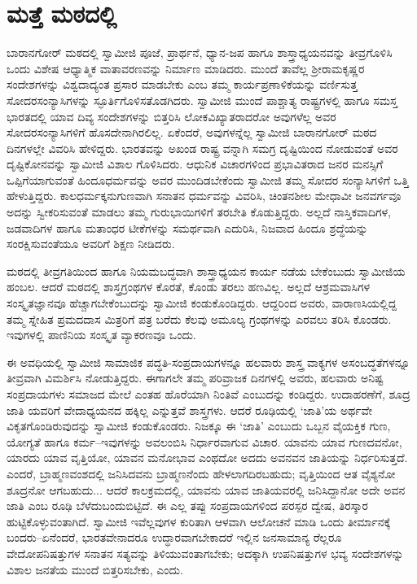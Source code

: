 
\chapter{ಮತ್ತೆ ಮಠದಲ್ಲಿ}

\noindent

ಬಾರಾನಗೋರ್ ಮಠದಲ್ಲಿ ಸ್ವಾಮೀಜಿ ಪೂಜೆ, ಪ್ರಾರ್ಥನೆ, ಧ್ಯಾನ-ಜಪ ಹಾಗೂ ಶಾಸ್ತ್ರಾಧ್ಯಯನವನ್ನು ತೀವ್ರಗೊಳಿಸಿ ಒಂದು ವಿಶೇಷ ಆಧ್ಯಾತ್ಮಿಕ ವಾತಾವರಣವನ್ನು ನಿರ್ಮಾಣ ಮಾಡಿದರು. ಮುಂದೆ ತಾವೆಲ್ಲ ಶ್ರೀರಾಮಕೃಷ್ಣರ ಸಂದೇಶಗಳನ್ನು ವಿಶ್ವದಾದ್ಯಂತ ಪ್ರಸಾರ ಮಾಡಬೇಕು ಎಂಬ ತಮ್ಮ ಕಾರ್ಯಪ್ರಣಾಳಿಕೆಯನ್ನು ವರ್ಣಿಸುತ್ತ ಸೋದರಸಂನ್ಯಾಸಿಗಳನ್ನು ಸ್ಫೂರ್ತಿಗೊಳಿಸತೊಡಗಿದರು. ಸ್ವಾಮೀಜಿ ಮುಂದೆ ಪಾಶ್ಚಾತ್ಯ ರಾಷ್ಟ್ರಗಳಲ್ಲಿ ಹಾಗೂ ಸಮಸ್ತ ಭಾರತದಲ್ಲಿ ಯಾವ ದಿವ್ಯ ಸಂದೇಶಗಳನ್ನು ಬಿತ್ತರಿಸಿ ಲೋಕವಿಖ್ಯಾತರಾದರೋ ಅವುಗಳೆಲ್ಲ ಅವರ ಸೋದರಸಂನ್ಯಾಸಿಗಳಿಗೆ ಹೊಸದೇನಾಗಿರಲಿಲ್ಲ. ಏಕೆಂದರೆ, ಅವುಗಳನ್ನೆಲ್ಲ ಸ್ವಾಮೀಜಿ ಬಾರಾನಗೋರ್ ಮಠದ ದಿನಗಳಲ್ಲೇ ವಿವರಿಸಿ ಹೇಳಿದ್ದರು. ಭಾರತವನ್ನು ಅಖಂಡ ರಾಷ್ಟ್ರ ವನ್ನಾಗಿ ಸಮಗ್ರ ದೃಷ್ಟಿಯಿಂದ ನೋಡುವಂತೆ ಅವರ ದೃಷ್ಟಿಕೋನವನ್ನು ಸ್ವಾಮೀಜಿ ವಿಶಾಲ ಗೊಳಿಸಿದರು. ಆಧುನಿಕ ವಿಚಾರಗಳಿಂದ ಪ್ರಭಾವಿತರಾದ ಜನರ ಮನಸ್ಸಿಗೆ ಒಪ್ಪಿಗೆಯಾಗುವಂತೆ ಹಿಂದೂಧರ್ಮವನ್ನು ಅವರ ಮುಂದಿಡಬೇಕೆಂದು ಸ್ವಾಮೀಜಿ ತಮ್ಮ ಸೋದರ ಸಂನ್ಯಾಸಿಗಳಿಗೆ ಒತ್ತಿ ಹೇಳುತ್ತಿದ್ದರು. ಕಾಲಧರ್ಮಕ್ಕನುಗುಣವಾಗಿ ಸನಾತನ ಧರ್ಮವನ್ನು ವಿವರಿಸಿ, ಚಿಂತನಶೀಲ ಮೇಧಾವೀ ಜನವರ್ಗವೂ ಅದನ್ನು ಸ್ವೀಕರಿಸುವಂತೆ ಮಾಡಲು ತಮ್ಮ ಗುರುಭಾಯಿಗಳಿಗೆ ತರಬೇತಿ ಕೊಡುತ್ತಿದ್ದರು. ಅಲ್ಲದೆ ನಾಸ್ತಿಕವಾದಿಗಳ, ಜಡವಾದಿಗಳ ಹಾಗೂ ಮತಾಂಧರ ಟೀಕೆಗಳನ್ನು ಸಮರ್ಥವಾಗಿ ಎದುರಿಸಿ, ನಿಜವಾದ ಹಿಂದೂ ಶ್ರದ್ಧೆಯನ್ನು ಸಂರಕ್ಷಿಸುವಂತೆಯೂ ಅವರಿಗೆ ಶಿಕ್ಷಣ ನೀಡಿದರು.

ಮಠದಲ್ಲಿ ತೀವ್ರಗತಿಯಿಂದ ಹಾಗೂ ನಿಯಮಬದ್ಧವಾಗಿ ಶಾಸ್ತ್ರಾಧ್ಯಯನ ಕಾರ್ಯ ನಡೆಯ ಬೇಕೆಂಬುದು ಸ್ವಾಮೀಜಿಯ ಹಂಬಲ. ಆದರೆ ಮಠದಲ್ಲಿ ಶಾಸ್ತ್ರಗ್ರಂಥಗಳ ಕೊರತೆ, ಕೊಂಡು ತರಲು ಹಣವಿಲ್ಲ. ಅಲ್ಲದೆ ಆಶ್ರಮವಾಸಿಗಳ ಸಂಸ್ಕೃತಜ್ಞಾನವೂ ಹೆಚ್ಚಾಗಬೇಕೆಂಬುದನ್ನು ಸ್ವಾಮೀಜಿ ಕಂಡುಕೊಂಡಿದ್ದರು. ಆದ್ದರಿಂದ ಅವರು, ವಾರಾಣಸಿಯಲ್ಲಿದ್ದ ತಮ್ಮ ಸ್ನೇಹಿತ ಪ್ರಮದದಾಸ ಮಿತ್ರರಿಗೆ ಪತ್ರ ಬರೆದು ಕೆಲವು ಅಮೂಲ್ಯ ಗ್ರಂಥಗಳನ್ನು ಎರವಲು ತರಿಸಿ ಕೊಂಡರು. ಇವುಗಳಲ್ಲಿ ಪಾಣಿನಿಯ ಸಂಸ್ಕೃತ ವ್ಯಾಕರಣವೂ ಒಂದು.

ಈ ಅವಧಿಯಲ್ಲಿ ಸ್ವಾಮೀಜಿ ಸಾಮಾಜಿಕ ಪದ್ಧತಿ-ಸಂಪ್ರದಾಯಗಳನ್ನೂ ಹಲವಾರು ಶಾಸ್ತ್ರ ವಾಕ್ಯಗಳ ಅಸಂಬದ್ಧತೆಗಳನ್ನೂ ತೀವ್ರವಾಗಿ ವಿಮರ್ಶಿಸಿ ನೋಡುತ್ತಿದ್ದರು. ಈಗಾಗಲೇ ತಮ್ಮ ಪರಿವ್ರಾಜಕ ದಿನಗಳಲ್ಲಿ ಅವರು, ಹಲವಾರು ಅನಿಷ್ಟ ಸಂಪ್ರದಾಯಗಳು ಸಮಾಜದ ಮೇಲೆ ಎಂತಹ ಹೊರೆಯಾಗಿ ನಿಂತಿವೆ ಎಂಬುದನ್ನು ಕಂಡಿದ್ದರು. ಉದಾಹರಣೆಗೆ, ಶೂದ್ರ ಜಾತಿ ಯವರಿಗೆ ವೇದಾಧ್ಯಯನದ ಹಕ್ಕಿಲ್ಲ ಎನ್ನುತ್ತವೆ ಶಾಸ್ತ್ರಗಳು. ಆದರೆ ರೂಢಿಯಲ್ಲಿ ‘ಜಾತಿ’ಯ ಅರ್ಥವೇ ವಿಕೃತಗೊಂಡಿರುವುದನ್ನು ಸ್ವಾಮೀಜಿ ಕಂಡುಕೊಂಡರು. ನಿಜಕ್ಕೂ ಈ ‘ಜಾತಿ’ ಎಂಬುದು ಒಬ್ಬನ ವೈಯಕ್ತಿಕ ಗುಣ, ಯೋಗ್ಯತೆ ಹಾಗೂ ಕರ್ಮ–ಇವುಗಳನ್ನು ಅವಲಂಬಿಸಿ ನಿರ್ಧಾರವಾಗುವ ವಿಚಾರ. ಯಾವನು ಯಾವ ಗುಣದವನೋ, ಯಾರದು ಯಾವ ವೃತ್ತಿಯೋ, ಯಾವನ ಮನೋಭಾವ ಎಂಥದೋ ಅದದು ಅವನವನ ಜಾತಿಯನ್ನು ನಿರ್ಧರಿಸುತ್ತದೆ. ಎಂದರೆ, ಬ್ರಾಹ್ಮಣವಂಶದಲ್ಲಿ ಜನಿಸಿದವನು ಬ್ರಾಹ್ಮಣನೆಂದು ಹೇಳಲಾಗದಿರಬಹುದು; ವೃತ್ತಿಯಿಂದ ಆತ ವೈಶ್ಯನೋ ಶೂದ್ರನೋ ಆಗಬಹುದು... ಆದರೆ ಕಾಲಕ್ರಮದಲ್ಲಿ, ಯಾವನು ಯಾವ ಜಾತಿಯವರಲ್ಲಿ ಜನಿಸಿದ್ದಾನೋ ಅದೇ ಅವನ ಜಾತಿ ಎಂಬ ರೂಢಿ ಬೆಳೆದುಬಂದುಬಿಟ್ಟಿದೆ. ಈ ಎಲ್ಲ ತಪ್ಪು ಸಂಪ್ರದಾಯಗಳಿಂದ ಪರಸ್ಪರ ದ್ವೇಷ, ತಿರಸ್ಕಾರ ಹುಟ್ಟಿಕೊಳ್ಳುವಂತಾಗಿದೆ. ಸ್ವಾಮೀಜಿ ಇವೆಲ್ಲವುಗಳ ಕುರಿತಾಗಿ ಆಳವಾಗಿ ಆಲೋಚನೆ ಮಾಡಿ ಒಂದು ತೀರ್ಮಾನಕ್ಕೆ ಬಂದರು–ಏನೆಂದರೆ, ಭಾರತವೇನಾದರೂ ಉದ್ಧಾರವಾಗಬೇಕಾದರೆ ಇಲ್ಲಿನ ಜನಸಾಮಾನ್ಯ ರೆಲ್ಲರೂ ವೇದೋಪನಿಷತ್ತುಗಳ ಸನಾತನ ಸತ್ಯವನ್ನು ತಿಳಿಯುವಂತಾಗಬೇಕು; ಅದಕ್ಕಾಗಿ ಉಪನಿಷತ್ತುಗಳ ಭವ್ಯ ಸಂದೇಶಗಳನ್ನು ವಿಶಾಲ ಜನತೆಯ ಮುಂದೆ ಬಿತ್ತರಿಸಬೇಕು, ಎಂದು.

